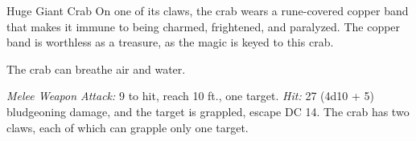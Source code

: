 \documentclass[10pt,a4paper,twoside,bg=print,twocolumn,openany,nodeprecatedcode]{dndbook}
\begin{document}
\begin{DndMonster}[float=t]{Huge Giant Crab}
\DndMonsterBasics[
armor-class = {15 (natural armor)},
hit-points = {\DndDice{14d12 + 70}},
speed = {30 ft., swim 30 ft.}
]
\DndMonsterAbilityScores[
 str = 20,
 dex = 15,
 con = 20,
 int = 1,
 wis = 9,
 cha = 3
]
\DndMonsterDetails[
skills = {Stealth +5},
condition-immunities = {charmed, frightened, paralyzed},
senses = {blindsight 30 ft., passive perception 9},
challenge = 8,
]
On one of its claws, the crab wears a rune-covered copper band that makes it immune to being charmed, frightened, and paralyzed. The copper band is worthless as a treasure, as the magic is keyed to this crab.

The crab can breathe air and water.

\textsl{Melee Weapon Attack:} 9 to hit, reach 10 ft., one target. \textsl{Hit:} 27 (4d10 + 5) bludgeoning damage, and the target is grappled, escape DC 14. The crab has two claws, each of which can grapple only one target.

\end{DndMonster}
\end{document}
